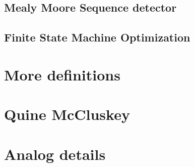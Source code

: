 \documentclass{book}
\begin{document}
\section{Mealy Moore Sequence detector}

\section{Finite State Machine Optimization}

%
\chapter{More definitions}

\chapter{Quine McCluskey}


\chapter{Analog details}




\end{document}
